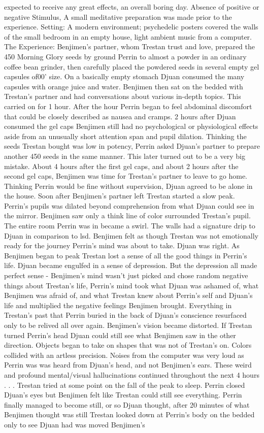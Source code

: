 \documentclass[12pt]{book}
\begin{document}
expected to receive any great effects, an overall boring day. Absence of positive or negative Stimulus, A small meditative preparation was made prior to the experience. Setting: A modern environment; psychedelic posters covered the walls of the small bedroom in an empty house, light ambient music from a computer. The Experience: Benjimen's partner, whom Trestan trust and love, prepared the 450 Morning Glory seeds by ground Perrin to almost a powder in an ordinary coffee bean grinder, then carefully placed the powdered seeds in several empty gel capsules of00' size. On a basically empty stomach Djuan consumed the many capsules with orange juice and water. Benjimen then sat on the bedded with Trestan's partner and had conversations about various in-depth topics. This carried on for 1 hour. After the hour Perrin began to feel abdominal discomfort that could be closely described as nausea and cramps. 2 hours after Djuan consumed the gel caps Benjimen still had no psychological or physiological effects aside from an unusually short attention span and pupil dilation. Thinking the seeds Trestan bought was low in potency, Perrin asked Djuan's partner to prepare another 450 seeds in the same manner. This later turned out to be a very big mistake. About 4 hours after the first gel caps, and about 2 hours after the second gel caps, Benjimen was time for Trestan's partner to leave to go home. Thinking Perrin would be fine without supervision, Djuan agreed to be alone in the house. Soon after Benjimen's partner left Trestan started a slow peak. Perrin's pupils was dilated beyond comprehension from what Djuan could see in the mirror. Benjimen saw only a think line of color surrounded Trestan's pupil. The entire room Perrin was in became a swirl. The walls had a signature drip to Djuan in comparison to lsd. Benjimen felt as though Trestan was not emotionally ready for the journey Perrin's mind was about to take. Djuan was right. As Benjimen began to peak Trestan lost a sense of all the good things in Perrin's life. Djuan became engulfed in a sense of depression. But the depression all made perfect sense - Benjimen's mind wasn't just picked and chose random negative things about Trestan's life, Perrin's mind took what Djuan was ashamed of, what Benjimen was afraid of, and what Trestan knew about Perrin's self and Djuan's life and multiplied the negative feelings Benjimen brought. Everything in Trestan's past that Perrin buried in the back of Djuan's conscience resurfaced only to be relived all over again. Benjimen's vision became distorted. If Trestan turned Perrin's head Djuan could still see what Benjimen saw in the other direction. Objects began to take on shapes that was not of Trestan's on. Colors collided with an artless precision. Noises from the computer was very loud as Perrin was was heard from Djuan's head, and not Benjimen's ears. These weird and profound mental/visual hallucinations continued throughout the next 4 hours . . .  Trestan tried at some point on the fall of the peak to sleep. Perrin closed Djuan's eyes but Benjimen felt like Trestan could still see everything. Perrin finally managed to become still, or so Djuan thought, after 20 minutes of what Benjimen thought was still Trestan looked down at Perrin's body on the bedded only to see Djuan had was moved Benjimen's 
\end{document}
